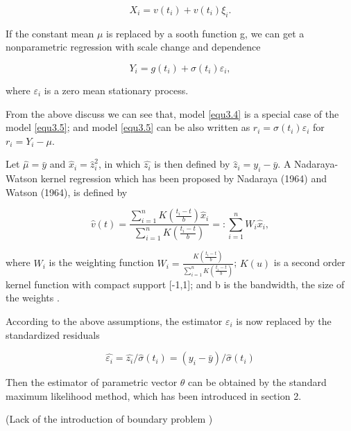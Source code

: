 \begin{equation}
\label{equ3.4}
 X_{i} = v(t_{i} )+ v(t_{i})\xi_{i}.
\end{equation}

If the constant mean $\mu$ is replaced by a sooth function g, we can get a nonparametric regression with scale change and dependence

\begin{equation}
\label{equ3.5}
Y_i= g(t_i)+\sigma(t_i)\varepsilon_i,
\end{equation}

where ${\varepsilon_i}$ is a zero mean stationary process.

From the above discuss we can see that, model \ref{equ3.4} is a special case of the model \ref{equ3.5}; and model \ref{equ3.5} can be also written as $r_i= \sigma(t_i)\varepsilon_i$ for  $ r_{i}=Y_{i}-\mu$.

Let $\hat{\mu }=\bar{y}$ and $\hat{x}_{i} = \hat{z}_{i}^{2}$, in which $\hat{z_{i}}$ is then defined by $\hat{z}_{i}=y_{i}-\bar{y}$. A Nadaraya-Watson kernel regression which has been proposed by Nadaraya (1964) and Watson (1964), is defined by

\begin{equation}
\hat{v}(t)=\frac{\sum_{i=1}^{n}K(\frac{t_i-t}{b})\hat{x}_i}{\sum_{i=1}^{n}K(\frac{t_i-t}{b})}=:\sum_{i=1}^nW_i\hat{x}_i,
\end{equation}

where $W_i$ is the weighting function  $W_i= \frac{K(\frac{t_i-t}{b})}{\sum_{i=1}^{n}K(\frac{t_i-t}{b})} $; $K(u)$ is a second order kernel function with compact support [-1,1]; and b is the bandwidth, the size of the weights \cite{Fan1993}. 

According to the above assumptions, the estimator $\varepsilon_{i}$  is now replaced by the standardized residuals

\begin{equation}
\hat{\varepsilon_i }=\hat{z_i}/\hat{\sigma }(t_i)=(y_i-\bar{y})/\hat{\sigma}(t_i) 
\end{equation}

Then the estimator of parametric vector $\theta$ can be obtained by the standard maximum likelihood method, which has been introduced in section 2.


(Lack of the introduction of boundary problem )



